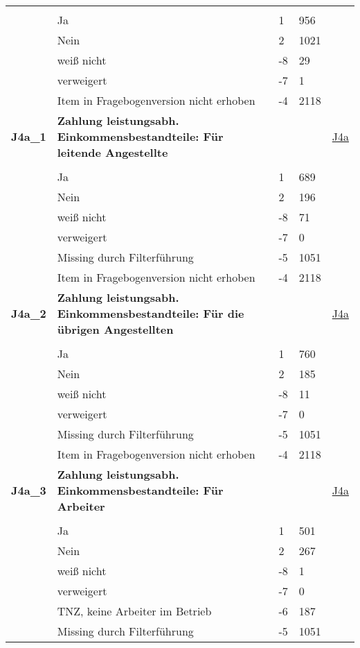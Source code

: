 \begin{longtable}{| L{2.5cm} | L{8.25cm}| C{1.5cm} | R{1.25cm} | C{2.25cm} |  }
   &  &  &  &  \\ 
   & Ja & 1 & 956 &  \\ 
   & Nein & 2 & 1021 &  \\ 
   & weiß nicht & -8 & 29 &  \\ 
   & verweigert & -7 & 1 &  \\ 
   & Item in Fragebogenversion nicht erhoben & -4 & 2118 &  \\ 
   \midrule
\textbf{J4a\_1}\label{var:suf:J4a:1} & \textbf{Zahlung leistungsabh. Einkommensbestandteile: Für leitende Angestellte} &  &  & \hyperref[J4a]{J4a} \\ 
   &  &  &  &  \\ 
   & Ja & 1 & 689 &  \\ 
   & Nein & 2 & 196 &  \\ 
   & weiß nicht & -8 & 71 &  \\ 
   & verweigert & -7 & 0 &  \\ 
   & Missing durch Filterführung & -5 & 1051 &  \\ 
   & Item in Fragebogenversion nicht erhoben & -4 & 2118 &  \\ 
   \midrule
\textbf{J4a\_2}\label{var:suf:J4a:2} & \textbf{Zahlung leistungsabh. Einkommensbestandteile: Für die übrigen Angestellten} &  &  & \hyperref[J4a]{J4a} \\ 
   &  &  &  &  \\ 
   & Ja & 1 & 760 &  \\ 
   & Nein & 2 & 185 &  \\ 
   & weiß nicht & -8 & 11 &  \\ 
   & verweigert & -7 & 0 &  \\ 
   & Missing durch Filterführung & -5 & 1051 &  \\ 
   & Item in Fragebogenversion nicht erhoben & -4 & 2118 &  \\ 
   \midrule
\textbf{J4a\_3}\label{var:suf:J4a:3} & \textbf{Zahlung leistungsabh. Einkommensbestandteile: Für Arbeiter} &  &  & \hyperref[J4a]{J4a} \\ 
   &  &  &  &  \\ 
   & Ja & 1 & 501 &  \\ 
   & Nein & 2 & 267 &  \\ 
   & weiß nicht & -8 & 1 &  \\ 
   & verweigert & -7 & 0 &  \\ 
   & TNZ, keine Arbeiter im Betrieb & -6 & 187 &  \\ 
   & Missing durch Filterführung & -5 & 1051 &  \\ 

\end{longtable}
